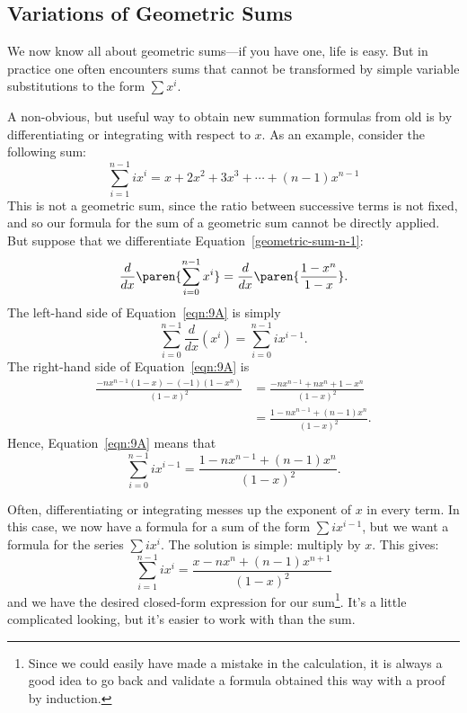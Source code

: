 \subsection{Variations of Geometric Sums}

We now know all about geometric sums---if you have one, life is easy.
But in practice one often encounters sums that cannot be transformed
by simple variable substitutions to the form $\sum x^i$.

A non-obvious, but useful way to obtain new summation formulas from
old is by differentiating or integrating with respect to $x$.  As an
example, consider the following sum:
\[
\sum_{i=1}^{n-1} i x^i = x + 2 x^2 + 3 x^3 + \cdots + (n - 1) x^{n - 1}
\]
This is not a geometric sum, since the ratio between successive terms
is not fixed, and so our formula for the sum of a geometric sum cannot
be directly applied.  But suppose that we differentiate
Equation~\ref{geometric-sum-n-1}:
\begin{equation}\label{eqn:9A}
\frac{d}{dx} \paren{ \sum_{i = 0}^{n - 1} x^i }
    = \frac{d}{dx} \paren{ \frac{1 - x^n}{1 - x} }.
\end{equation}
The left-hand side of Equation~\ref{eqn:9A} is simply
\begin{equation*}
\sum_{i = 0}^{n - 1} \frac{d}{dx} (x^i)
    = \sum_{i = 0}^{n - 1} i x^{i - 1}.
\end{equation*}
The right-hand side of Equation~\ref{eqn:9A} is
\begin{align*}
\frac{ -n x^{n - 1} (1 - x) - (-1) (1 - x^n) }{ (1 - x)^2 }
    &= \frac{ -n x^{n - 1} + n x^n + 1 - x^n }{ (1 - x)^2 } \\
    &= \frac{1 - n x^{n - 1} + (n - 1) x^n}{ (1 - x)^2 }.
\end{align*}
Hence, Equation~\ref{eqn:9A} means that
\begin{equation*}
\sum_{i = 0}^{n - 1} i x^{i - 1}
    = \frac{1 - n x^{n - 1} + (n - 1) x^n}{ (1 - x)^2 }.
\end{equation*}

Often, differentiating or integrating messes up the exponent of $x$ in
every term.  In this case, we now have a formula for a sum of the form
$\sum i x^{i-1}$, but we want a formula for the series $\sum i x^i$.
The solution is simple: multiply by $x$.  This gives:
\begin{equation}\label{eqn:G1}
    \sum_{i=1}^{n - 1} i x^i = \frac{ x - n x^n + (n - 1) x^{n+1}}{(1 - x)^2}
\end{equation}
and we have the desired closed-form expression for our
sum\footnote{Since we could easily have made a mistake in the
  calculation, it is always a good idea to go back and validate a
  formula obtained this way with a proof by induction.}.  It's a
little complicated looking, but it's easier to work with than the sum.


